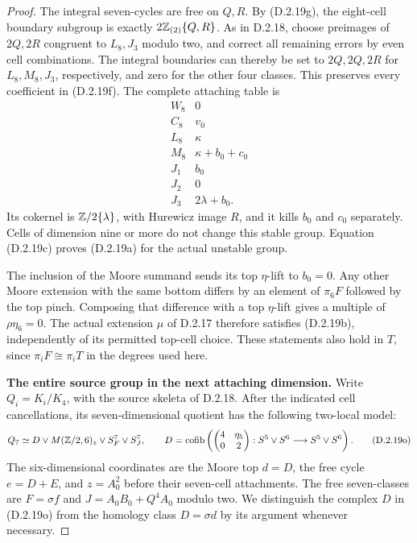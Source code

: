 \begin{proof}
The integral seven-cycles are free on $Q,R$. By
\textup{(D.2.19g)}, the eight-cell boundary subgroup
is exactly $2\mathbb Z_{(2)}\{Q,R\}$. As in D.2.18,
choose preimages of $2Q,2R$ congruent to $L_8,J_3$
modulo two, and correct all remaining errors by even
cell combinations. The integral boundaries can thereby
be set to $2Q,2Q,2R$ for $L_8,M_8,J_3$, respectively,
and zero for the other four classes. This preserves
every coefficient in \textup{(D.2.19f)}.
The complete attaching table is
\[
\begin{array}{c|c}
 W_8&0\\
 C_8&v_0\\
 L_8&\kappa\\
 M_8&\kappa+b_0+c_0\\
 J_1&b_0\\
 J_2&0\\
 J_3&2\lambda+b_0.
\end{array}
 \tag{D.2.19n}
\]
Its cokernel is $\mathbb Z/2\{\lambda\}$, with Hurewicz
image $R$, and it kills $b_0$ and $c_0$ separately.
Cells of dimension nine or more do not change this
stable group. Equation \textup{(D.2.19c)} proves
\textup{(D.2.19a)} for the actual unstable group.

The inclusion of the Moore summand sends its top
$\eta$-lift to $b_0=0$. Any other Moore extension with
the same bottom differs by an element of $\pi_6F$
followed by the top pinch. Composing that difference
with a top $\eta$-lift gives a multiple of
$\rho\eta_6=0$. The actual extension $\mu$ of D.2.17
therefore satisfies \textup{(D.2.19b)}, independently
of its permitted top-cell choice. These statements
also hold in $T$, since $\pi_iF\cong\pi_iT$ in the
degrees used here.

\medskip\noindent
\textbf{The entire source group in the next attaching dimension.}
Write $Q_i=K_i/K_4$, with the source skeleta of D.2.18.
After the indicated cell cancellations, its seven-dimensional
quotient has the following two-local model:
\[
 Q_7\simeq D\vee M(\mathbb Z/2,6)_z\vee S^7_F\vee S^7_J,
 \qquad
 D=\operatorname{cofib}\left(
 \begin{pmatrix}4&\eta_5\\0&2\end{pmatrix}:
 S^5\vee S^6\longrightarrow S^5\vee S^6\right).
 \tag{D.2.19o}
\]
The six-dimensional coordinates are the Moore top $d=D$,
the free cycle $e=D+E$, and $z=A_0^2$ before their seven-cell
attachments. The free seven-classes are
$F=\sigma f$ and $J=A_0B_0+Q^4A_0$ modulo two.
We distinguish the complex $D$ in \textup{(D.2.19o)} from
the homology class $D=\sigma d$ by its argument whenever
necessary.


\end{proof}
